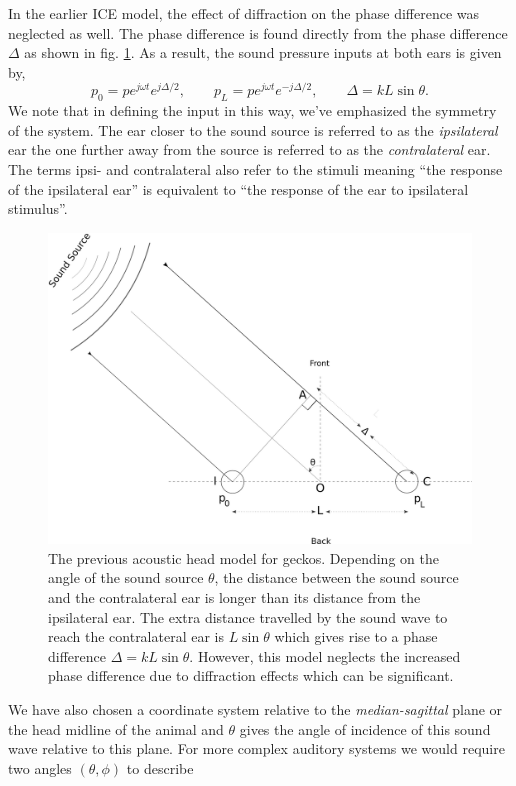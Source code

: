 In the earlier ICE model, the effect of diffraction on the phase difference was neglected as well. The phase difference
is found directly from the phase difference $\Delta$ as shown in fig. \ref{fig:oldheadmodel}.
As a result, the sound pressure inputs at both ears is given by,
\begin{equation}\label{oldsoundinput}
p_0=pe^{j\omega t} e^{j\Delta/2},\qquad p_L=pe^{j\omega t} e^{-j\Delta/2},\qquad \Delta=kL\sin\theta.
\end{equation}
We note that in defining the input in this way, we've emphasized the symmetry of the system.
The ear closer to the sound source is referred to as the \textit{ipsilateral} ear the one further away from the source is referred to as the \textit{contralateral} ear. 
The terms ipsi- and contralateral also refer to the stimuli meaning ``the response of the ipsilateral ear'' is equivalent to ``the response of the ear
to ipsilateral stimulus''.
\begin{figure}[ht]
 \includegraphics[width=.75\linewidth]{Diagrams/acousticheadmodelold.png}
 \caption[Previous acoustic head model for geckos]{The previous acoustic head model for geckos. Depending on the angle of the sound source $\theta$,
 the distance between the sound source and the contralateral ear is longer than its distance from the ipsilateral ear. The extra distance travelled by the sound wave to reach the contralateral ear 
 is $L\sin\theta$ which gives rise to a phase difference $\Delta=kL\sin\theta$. However, this model neglects the increased phase difference due to diffraction effects which can be significant.}
 \label{fig:oldheadmodel}
\end{figure}
We have also chosen a coordinate
system relative to the \textit{median-sagittal} plane or the head midline of the animal and $\theta$ gives the angle of incidence of this
sound wave relative to this plane. For more complex auditory systems we would require two angles $(\theta, \phi)$ to describe
